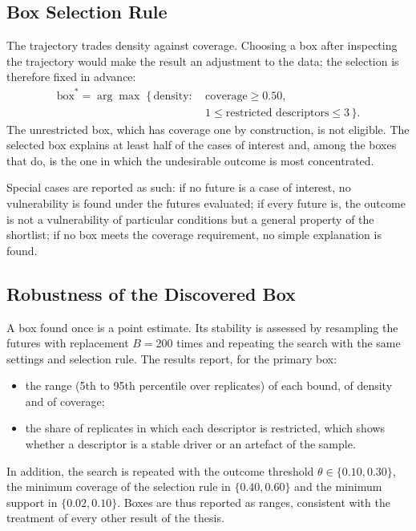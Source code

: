 \subsection{Box Selection Rule}
\label{subsec:prim_selection}

The trajectory trades density against coverage. Choosing a box after inspecting
the trajectory would make the result an adjustment to the data; the selection is
therefore fixed in advance:
\begin{equation}
    \begin{aligned}
        \mathrm{box}^{*}=\arg\max\;\{\,\mathrm{density}:\ & \mathrm{coverage}\geq0.50,\\
        & 1\leq\text{restricted descriptors}\leq3\,\}.
    \end{aligned}
    \label{eq:prim_selection}
\end{equation}
The unrestricted box, which has coverage one by construction, is not eligible.
The selected box explains at least half of the cases of interest and, among the
boxes that do, is the one in which the undesirable outcome is most concentrated.

Special cases are reported as such: if no future is a case of interest, no
vulnerability is found under the futures evaluated; if every future is, the
outcome is not a vulnerability of particular conditions but a general property
of the shortlist; if no box meets the coverage requirement, no simple
explanation is found.

\subsection{Robustness of the Discovered Box}
\label{subsec:prim_robustness}

A box found once is a point estimate. Its stability is assessed by resampling the
futures with replacement $B=200$ times and repeating the search with the same
settings and selection rule. The results report, for the primary box:
\begin{itemize}
    \item the range (5th to 95th percentile over replicates) of each bound, of
    density and of coverage;
    \item the share of replicates in which each descriptor is restricted, which
    shows whether a descriptor is a stable driver or an artefact of the sample.
\end{itemize}
In addition, the search is repeated with the outcome threshold
$\theta\in\{0.10,0.30\}$, the minimum coverage of the selection rule in
$\{0.40,0.60\}$ and the minimum support in $\{0.02,0.10\}$. Boxes are thus reported
as ranges, consistent with the treatment of every other result of the thesis.

